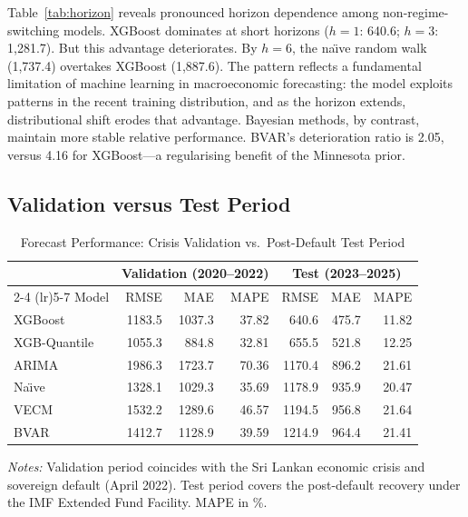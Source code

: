 \documentclass[12pt,a4paper]{article}
\begin{document}
Table~\ref{tab:horizon} reveals pronounced horizon dependence among non-regime-switching models. XGBoost dominates at short horizons ($h=1$: 640.6; $h=3$: 1,281.7). But this advantage deteriorates. By $h=6$, the na\"{\i}ve random walk (1,737.4) overtakes XGBoost (1,887.6). The pattern reflects a fundamental limitation of machine learning in macroeconomic forecasting: the model exploits patterns in the recent training distribution, and as the horizon extends, distributional shift erodes that advantage. Bayesian methods, by contrast, maintain more stable relative performance. BVAR's deterioration ratio is 2.05, versus 4.16 for XGBoost---a regularising benefit of the Minnesota prior.

\subsection{Validation versus Test Period}

\begin{table}[htbp]
\centering
\caption{Forecast Performance: Crisis Validation vs.\ Post-Default Test Period}
\label{tab:val_vs_test}
\begin{tabular}{lrrr@{\hskip 12pt}rrr}
\toprule
& \multicolumn{3}{c}{Validation (2020--2022)} & \multicolumn{3}{c}{Test (2023--2025)} \\
\cmidrule(lr){2-4} \cmidrule(lr){5-7}
Model & RMSE & MAE & MAPE & RMSE & MAE & MAPE \\
\midrule
XGBoost & 1183.5 & 1037.3 & 37.82 & 640.6 & 475.7 & 11.82 \\
XGB-Quantile & 1055.3 & 884.8 & 32.81 & 655.5 & 521.8 & 12.25 \\
ARIMA & 1986.3 & 1723.7 & 70.36 & 1170.4 & 896.2 & 21.61 \\
Na\"{\i}ve & 1328.1 & 1029.3 & 35.69 & 1178.9 & 935.9 & 20.47 \\
VECM & 1532.2 & 1289.6 & 46.57 & 1194.5 & 956.8 & 21.64 \\
BVAR & 1412.7 & 1128.9 & 39.59 & 1214.9 & 964.4 & 21.41 \\
\bottomrule
\end{tabular}
\begin{tablenotes}
\small
\item \textit{Notes:} Validation period coincides with the Sri Lankan economic crisis and sovereign default (April 2022). Test period covers the post-default recovery under the IMF Extended Fund Facility. MAPE in \%.
\end{tablenotes}
\end{table}
\end{document}
